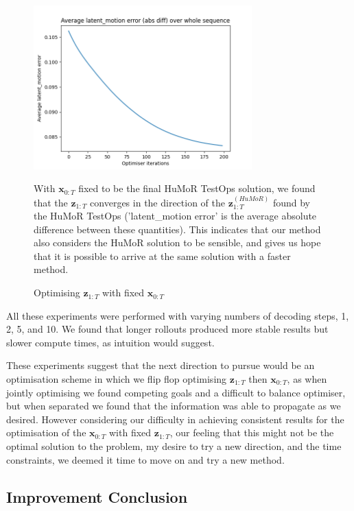 \begin{figure}
    \label{fig:zs_converge_to_humor_zs}
    \centering
    \includegraphics[width=0.75\textwidth]{Figures/humor/experiments/avg_latent_motion_error.png}
    \caption{Optimising $\mathbf{z}_{1:T}$ with fixed $\mathbf{x}_{0:T}$}
    \medskip
    \small
    With $\mathbf{x}_{0:T}$ fixed to be the final HuMoR TestOps solution, we found that the $\mathbf{z}_{1:T}$ converges in the direction of the $\mathbf{z}_{1:T}^{(HuMoR)}$ found by the HuMoR TestOps ('latent\_motion error' is the average absolute difference between these quantities). This indicates that our method also considers the HuMoR solution to be sensible, and gives us hope that it is possible to arrive at the same solution with a faster method.
\end{figure}

All these experiments were performed with varying numbers of decoding steps, 1, 2, 5, and 10. We found that longer rollouts produced more stable results but slower compute times, as intuition would suggest. 

These experiments suggest that the next direction to pursue would be an optimisation scheme in which we flip flop optimising $\mathbf{z}_{1:T}$ then $\mathbf{x}_{0:T}$, as when jointly optimising we found competing goals and a difficult to balance optimiser, but when separated we found that the information was able to propagate as we desired. However considering our difficulty in achieving consistent results for the optimisation of the $\mathbf{x}_{0:T}$ with fixed $\mathbf{z}_{1:T}$, our feeling that this might not be the optimal solution to the problem, my desire to try a new direction, and the time constraints, we deemed it time to move on and try a new method.

\subsection{Improvement Conclusion}

